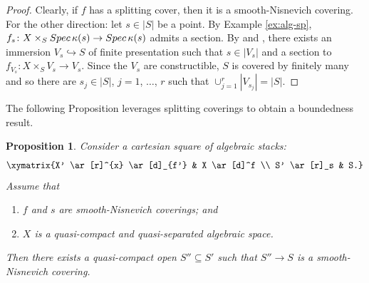 \documentclass[10pt]{amsart}
\theoremstyle{plain}
\newtheorem{lemma}[thm]{Lemma}
\newtheorem{proposition}[thm]{Proposition}
\theoremstyle{definition}
\newcommand{\Spec}{{\rm Spec \,}}
\begin{document}
\begin{proof}
	Clearly, if $f$ has a splitting cover, then it is a
	smooth-Nisnevich covering. For the other direction: let $s\in |S|$
	be a point. By Example \ref{ex:alg-sp},
	$f_s \colon X\times_S \Spec \kappa(s) \to \Spec \kappa(s)$ admits a
	section. By \cite[Lem.~2.1]{MR3754421} and \cite[Prop.~B.2 \&
	B.3]{RydhApproximation}, there exists an immersion $V_s \hookrightarrow S$
	of finite presentation such that $s\in |V_s|$ and a section to
	$f_{V_s} \colon X\times_S V_s \to V_s$. Since the $V_s$ are
	constructible, $S$ is covered by finitely many and so there are
	$s_j \in |S|$, $j=1$, $\dots$, $r$ such that
	$\cup_{j=1}^{r} |V_{s_j}| = |S|$. %
\end{proof}
The following Proposition leverages splitting coverings to obtain a boundedness result.
\begin{proposition}\label{P:boundedness}
	Consider a cartesian square of algebraic stacks:
	\[
	\xymatrix{X' \ar[r]^{x} \ar[d]_{f'} & X \ar[d]^f \\ S' \ar[r]_s &
		S.}
	\]
	Assume that
	\begin{enumerate}
		\item $f$ and $s$ are smooth-Nisnevich coverings; and
		\item $X$ is a quasi-compact and quasi-separated algebraic space.
	\end{enumerate}
	Then there exists a quasi-compact open $S'' \subseteq S'$ such that
	$S'' \to S$ is a smooth-Nisnevich covering.
\end{proposition}
\end{document}
